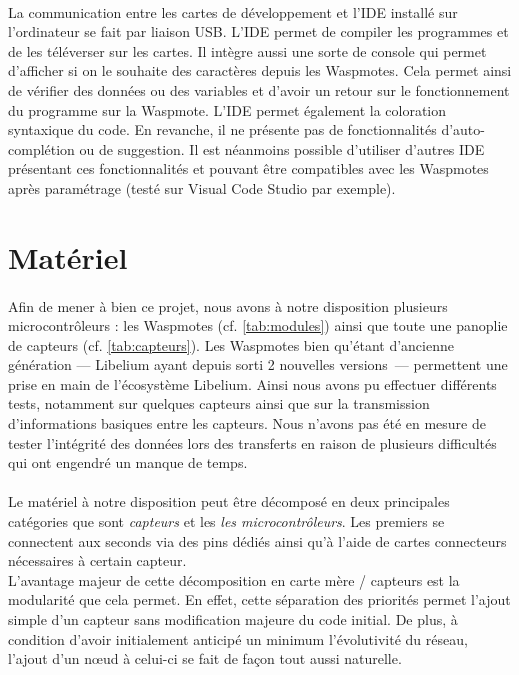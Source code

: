     \paragraph{}La communication entre les cartes de développement et l'IDE installé sur l'ordinateur se fait par liaison USB. L'IDE permet de compiler les programmes et de les téléverser sur les cartes. Il intègre aussi une sorte de console qui permet d'afficher si on le souhaite des caractères depuis les Waspmotes. Cela permet ainsi de vérifier des données ou des variables et d'avoir un retour sur le fonctionnement du programme sur la Waspmote. L'IDE permet également la coloration syntaxique du code. En revanche, il ne présente pas de fonctionnalités d'auto-complétion ou de suggestion. Il est néanmoins possible d'utiliser d'autres IDE présentant ces fonctionnalités et pouvant être compatibles avec les Waspmotes après paramétrage (testé sur Visual Code Studio par exemple).
    
    
\section{Matériel}
    \paragraph{}Afin de mener à bien ce projet, nous avons à notre disposition plusieurs microcontrôleurs : les Waspmotes (cf. \ref{tab:modules}) ainsi que toute une panoplie de capteurs (cf. \ref{tab:capteurs}). Les Waspmotes bien qu'étant d'ancienne génération --- Libelium ayant depuis sorti 2 nouvelles versions~--- permettent une prise en main de l'écosystème Libelium. Ainsi nous avons pu effectuer différents tests, notamment sur quelques capteurs ainsi que sur la transmission d'informations basiques entre les capteurs. Nous n'avons pas été en mesure de tester l'intégrité des données lors des transferts en raison de plusieurs difficultés qui ont engendré un manque de temps.
    
    \paragraph{}Le matériel à notre disposition peut être décomposé en deux principales catégories que sont \emph{capteurs} et les \emph{les microcontrôleurs}. Les premiers se connectent aux seconds via des pins dédiés ainsi qu'à l'aide de cartes connecteurs nécessaires à certain capteur.\\
    L'avantage majeur de cette décomposition en carte mère / capteurs est la modularité que cela permet. En effet, cette séparation des priorités permet l'ajout simple d'un capteur sans modification majeure du code initial. De plus, à condition d'avoir initialement anticipé un minimum l'évolutivité du réseau, l'ajout d'un n\oe ud à celui-ci se fait de façon tout aussi naturelle.
    
